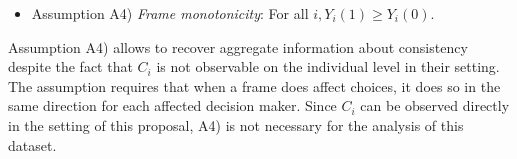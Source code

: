 \begin{itemize}
    \item Assumption A4) \textit{Frame monotonicity}: For all $ i, Y_i(1) \geq Y_i(0) $.
\end{itemize}

Assumption A4) allows \textcite{goldin2020} to recover aggregate information
about consistency despite the fact that $ C_i $ is not observable on the individual level in their setting. The assumption
requires that when a frame does affect choices, it does so in the same
direction for each affected decision maker.
Since $ C_i $ can be observed directly in the setting of this proposal, A4) is not necessary for the analysis of this
dataset.